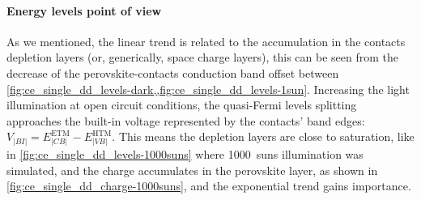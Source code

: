 		\paragraph{Energy levels point of view}\label{ce_energy_levels}
		As we mentioned, the linear trend is related to the accumulation in the contacts depletion layers (or, generically, space charge layers), this can be seen from the decrease of the perovskite\hyp{}contacts conduction band offset between \cref{fig:ce_single_dd_levels-dark,,fig:ce_single_dd_levels-1sun}.
		Increasing the light illumination at open circuit conditions, the quasi\hyp{}Fermi levels splitting approaches the built\hyp{}in voltage represented by the contacts' band edges: $V_|BI| = E_|CB|^{\mathrm{ETM}} - E_|VB|^{\mathrm{HTM}}$.
		This means the depletion layers are close to saturation, like in \cref{fig:ce_single_dd_levels-1000suns} where \SI{1000}{suns} illumination was simulated, and the charge accumulates in the perovskite layer, as shown in \cref{fig:ce_single_dd_charge-1000suns}, and the exponential trend gains importance.

					\begin{figure}
		\end{figure}


